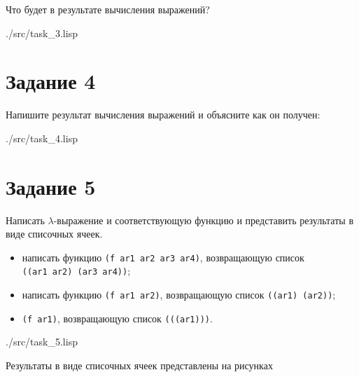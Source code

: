 Что будет в результате вычисления выражений?
\begin{lstinputlisting}[
	caption={Задание 3},
	label={lst:t3},
	style={lsp},
	]{./src/task_3.lisp}
\end{lstinputlisting}

\section*{Задание 4}
Напишите результат вычисления выражений и объясните как он получен:
\begin{lstinputlisting}[
	caption={Задание 4},
	label={lst:t4},
	style={lsp},
	]{./src/task_4.lisp}
\end{lstinputlisting}

\section*{Задание 5}

Написать $\lambda$-выражение и соответствующую функцию и представить результаты в виде списочных ячеек.

\begin{itemize}[label=---]
	\item написать функцию {\texttt{(f ar1 ar2 ar3 ar4)}}, возвращающую список \\{\texttt{((ar1 ar2) (ar3 ar4))}};
	\item написать функцию {\texttt{(f ar1 ar2)}}, возвращающую список {\texttt{((ar1) (ar2))}};
	\item {\texttt{(f ar1)}}, возвращающую список {\texttt{(((ar1)))}}.
\end{itemize}


\begin{lstinputlisting}[
	caption={Задание 5},
	label={lst:t5},
	style={lsp},
	]{./src/task_5.lisp}
\end{lstinputlisting}

Результаты в виде списочных ячеек представлены на рисунках 

